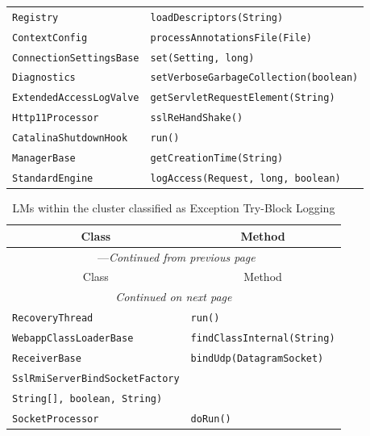 \begin{center}
\begin{longtable}{ll}
\lstinline/Registry/&{\lstinline/loadDescriptors(String)/}\\
\lstinline/ContextConfig/&{\lstinline/processAnnotationsFile(File)/}\\
\lstinline/ConnectionSettingsBase/&{\lstinline/set(Setting, long)/}\\
\lstinline/Diagnostics/&{\lstinline/setVerboseGarbageCollection(boolean)/}\\
\lstinline/ExtendedAccessLogValve/&{\lstinline/getServletRequestElement(String)/}\\
\lstinline/Http11Processor/&{\lstinline/sslReHandShake()/}\\
\lstinline/CatalinaShutdownHook/&{\lstinline/run()/}\\
\lstinline/ManagerBase/&{\lstinline/getCreationTime(String)/}\\
\lstinline/StandardEngine/&{\lstinline/logAccess(Request, long, boolean)/}\\
\end{longtable}
\end{center}

\begin{center}
\begin{longtable}{ll}
\caption{LMs within the cluster classified as Exception Try-Block Logging}\\
\toprule\multicolumn{1}{c}{Class}&\multicolumn{1}{c}{Method}\\\midrule
\endfirsthead

\multicolumn{2}{c}{\tablename\ \thetable{}---\textit{Continued from previous page}} \\\midrule
\multicolumn{1}{c}{Class}&\multicolumn{1}{c}{Method}\\\midrule
\endhead
\multicolumn{2}{c}{\textit{Continued on next page}}\\\midrule
\endfoot
\bottomrule
\endlastfoot

\lstinline/RecoveryThread/&{\lstinline/run()/}\\
\lstinline/WebappClassLoaderBase/&{\lstinline/findClassInternal(String)/}\\
\lstinline/ReceiverBase/&{\lstinline/bindUdp(DatagramSocket)/}\\
\lstinline/SslRmiServerBindSocketFactory/&\raisebox{-13pt}{\shortstack{\lstinline/SslRmiServerBindSocketFactory(String[],/\\\lstinline/String[], boolean, String)/}}\\
\lstinline/SocketProcessor/&{\lstinline/doRun()/}\\
\end{longtable}
\end{center}
\newpage

